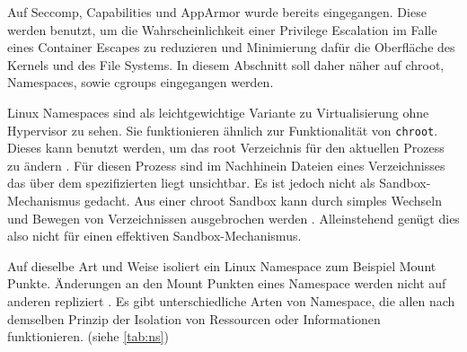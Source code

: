 Auf Seccomp, Capabilities und AppArmor wurde bereits eingegangen. Diese werden
benutzt, um die Wahrscheinlichkeit einer Privilege Escalation im Falle eines Container Escapes zu reduzieren und Minimierung dafür die Oberfläche des Kernels und des File Systems. In diesem Abschnitt soll daher näher auf chroot, Namespaces, sowie cgroups eingegangen werden.

Linux Namespaces sind als leichtgewichtige Variante zu Virtualisierung ohne Hypervisor zu sehen. Sie funktionieren ähnlich zur Funktionalität von \texttt{chroot}. Dieses kann benutzt werden, um das root Verzeichnis für den aktuellen Prozess zu ändern . Für diesen Prozess sind im Nachhinein Dateien eines Verzeichnisses das über dem spezifizierten liegt unsichtbar. Es ist jedoch nicht als Sandbox-Mechanismus gedacht. Aus einer chroot Sandbox kann
durch simples Wechseln und Bewegen von Verzeichnissen ausgebrochen werden \cite{man-chroot}. Alleinstehend genügt dies also nicht für einen effektiven Sandbox-Mechanismus.

Auf dieselbe Art und Weise isoliert ein Linux Namespace zum Beispiel Mount Punkte. Änderungen an den Mount Punkten eines Namespace
werden nicht auf anderen repliziert \cite{man-mount-ns}.
Es gibt unterschiedliche Arten von Namespace, die allen nach demselben Prinzip der Isolation von Ressourcen oder Informationen funktionieren. (siehe \ref{tab:ns})

\begin{table}[]
\label{tab:ns}
\centering
{}
\caption{Aus \cite{man-ns-7}}
\end{table}

